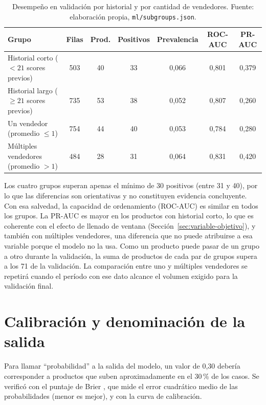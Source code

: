 \begin{table}[H]
	\centering
	\small
	\caption{Desempeño en validación por historial y por cantidad de vendedores. Fuente: elaboración propia, \texttt{ml/subgroups.json}.}
	\label{tab:ml-subgrupos}
	\begin{tabularx}{\textwidth}{@{}>{\raggedright\arraybackslash}X cccccc@{}}
		\toprule
		\textbf{Grupo} & \textbf{Filas} & \textbf{Prod.} & \textbf{Positivos} & \textbf{Prevalencia} & \textbf{ROC-AUC} & \textbf{PR-AUC} \\
		\midrule
		Historial corto ($<21$ scores previos) & 503 & 40 & 33 & 0,066 & 0,801 & 0,379 \\
		Historial largo ($\geq 21$ scores previos) & 735 & 53 & 38 & 0,052 & 0,807 & 0,260 \\
		Un vendedor (promedio $\leq 1$) & 754 & 44 & 40 & 0,053 & 0,784 & 0,280 \\
		Múltiples vendedores (promedio $> 1$) & 484 & 28 & 31 & 0,064 & 0,831 & 0,420 \\
		\bottomrule
	\end{tabularx}
\end{table}

Los cuatro grupos superan apenas el mínimo de 30 positivos (entre 31 y 40), por lo que las diferencias son orientativas y no constituyen evidencia concluyente. Con esa salvedad, la capacidad de ordenamiento (ROC-AUC) es similar en todos los grupos. La PR-AUC es mayor en los productos con historial corto, lo que es coherente con el efecto de llenado de ventana (Sección~\ref{sec:variable-objetivo}), y también con múltiples vendedores, una diferencia que no puede atribuirse a esa variable porque el modelo no la usa. Como un producto puede pasar de un grupo a otro durante la validación, la suma de productos de cada par de grupos supera a los 71 de la validación. La comparación entre uno y múltiples vendedores se repetirá cuando el período con ese dato alcance el volumen exigido para la validación final.

\section{Calibración y denominación de la salida}\label{sec:ml-calibracion}

Para llamar ``probabilidad'' a la salida del modelo, un valor de 0,30 debería corresponder a productos que suben aproximadamente en el 30\,\% de los casos. Se verificó con el puntaje de Brier \parencite{Brier1950}, que mide el error cuadrático medio de las probabilidades (menor es mejor), y con la curva de calibración.


